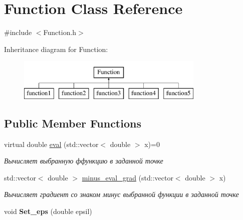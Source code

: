 \hypertarget{class_function}{}\section{Function Class Reference}
\label{class_function}


{\ttfamily \#include $<$Function.\+h$>$}

Inheritance diagram for Function\+:\begin{figure}[H]
\begin{center}
\leavevmode
\includegraphics[height=2.000000cm]{class_function}
\end{center}
\end{figure}
\subsection*{Public Member Functions}
\begin{DoxyCompactItemize}
\item 
\mbox{\label{class_function_a718c397736583f381104e7eb5cc25d49}} 
virtual double \mbox{\hyperlink{class_function_a718c397736583f381104e7eb5cc25d49}{eval}} (std\+::vector$<$ double $>$ x)=0
\begin{DoxyCompactList}\small\item\em Вычисляет выбранную ффункцию в заданной точке \end{DoxyCompactList}\item 
\mbox{\label{class_function_aa160e1771be2c8724eb32e6d841a2d37}} 
std\+::vector$<$ double $>$ \mbox{\hyperlink{class_function_aa160e1771be2c8724eb32e6d841a2d37}{minus\+\_\+eval\+\_\+grad}} (std\+::vector$<$ double $>$ x)
\begin{DoxyCompactList}\small\item\em Вычисляет градиент со знаком минус выбранной функции в заданной точке \end{DoxyCompactList}\item 
\mbox{\label{class_function_aabb9556d29e6899785a2cbacad2901ea}} 
void {\bfseries Set\+\_\+eps} (double epsil)
\end{DoxyCompactItemize}
